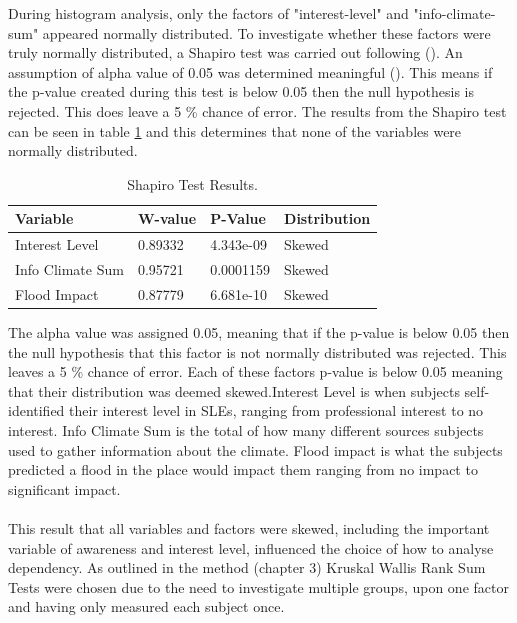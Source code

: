 During histogram analysis, only the factors of "interest-level" and "info-climate-sum" appeared normally distributed. To investigate whether these factors were truly normally distributed, a Shapiro test was carried out following (\cite{royston_extension_1982}).  An assumption of alpha value of 0.05 was determined meaningful (\cite{royston_extension_1982}). This means if the p-value created during this test is below 0.05 then the null hypothesis is rejected. This does leave a 5 \% chance of error. The results from the Shapiro test can be seen in table \ref{table:shapiro_test_results} and this determines that none of the variables were normally distributed. 

\begin{table}[H]
    \centering
    \begin{tabular}{|l|l|l|l|}
    \hline
         \textbf{ Variable } &  \textbf{W-value}& \textbf{ P-Value}& \textbf{Distribution}\\ \hline
       Interest Level & 0.89332 & 4.343e-09 & Skewed \\ \hline
         Info Climate Sum  & 0.95721 & 0.0001159 & Skewed \\ \hline
        Flood Impact & 0.87779 & 6.681e-10 & Skewed \\ \hline
     \end{tabular}
    \caption{Shapiro Test Results.} {The alpha value was assigned 0.05, meaning that if the p-value is below 0.05 then the null hypothesis that this factor is not normally distributed was rejected. This leaves a 5 \% chance of error. Each of these factors p-value is below 0.05 meaning that their distribution was deemed skewed.Interest Level is when subjects self-identified their interest level in SLEs, ranging from professional interest to no interest. Info Climate Sum is the total of how many different sources subjects used to gather information about the climate. Flood impact is what the subjects predicted a flood in the place would impact them ranging from no impact to significant impact. }
    \label{table:shapiro_test_results}
\end{table}
\paragraph{}

This result that all variables and factors were skewed, including the important variable of awareness and interest level, influenced the choice of how to analyse dependency. As outlined in the method (chapter 3) Kruskal Wallis Rank Sum Tests were chosen due to the need to investigate multiple groups, upon one factor and having only measured each subject once.

